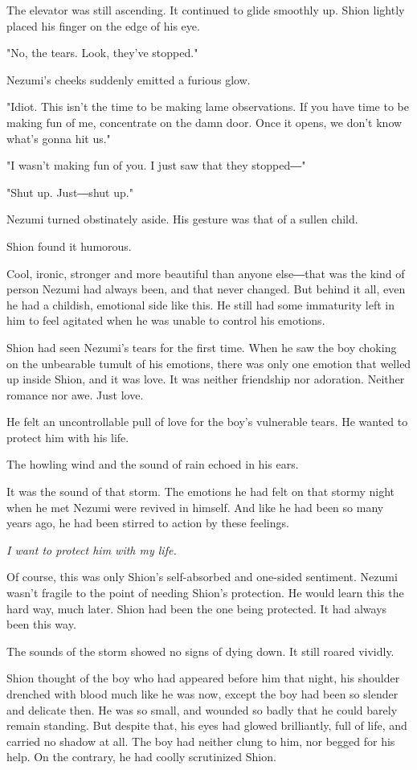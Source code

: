 The elevator was still ascending. It continued to glide smoothly up.
Shion lightly placed his finger on the edge of his eye.

"No, the tears. Look, they've stopped."

Nezumi's cheeks suddenly emitted a furious glow.

"Idiot. This isn't the time to be making lame observations. If you have
time to be making fun of me, concentrate on the damn door. Once it
opens, we don't know what's gonna hit us."

"I wasn't making fun of you. I just saw that they stopped―"

"Shut up. Just―shut up."

Nezumi turned obstinately aside. His gesture was that of a sullen child.

Shion found it humorous.

Cool, ironic, stronger and more beautiful than anyone else―that was the
kind of person Nezumi had always been, and that never changed. But
behind it all, even he had a childish, emotional side like this. He
still had some immaturity left in him to feel agitated when he was
unable to control his emotions.

Shion had seen Nezumi's tears for the first time. When he saw the boy
choking on the unbearable tumult of his emotions, there was only one
emotion that welled up inside Shion, and it was love. It was neither
friendship nor adoration. Neither romance nor awe. Just love.

He felt an uncontrollable pull of love for the boy's vulnerable tears.
He wanted to protect him with his life.

The howling wind and the sound of rain echoed in his ears.

It was the sound of that storm. The emotions he had felt on that stormy
night when he met Nezumi were revived in himself. And like he had been
so many years ago, he had been stirred to action by these feelings.

\emph{I want to protect him with my life.}

Of course, this was only Shion's self-absorbed and one-sided sentiment.
Nezumi wasn't fragile to the point of needing Shion's protection. He
would learn this the hard way, much later. Shion had been the one being
protected. It had always been this way.

The sounds of the storm showed no signs of dying down. It still roared
vividly.

Shion thought of the boy who had appeared before him that night, his
shoulder drenched with blood much like he was now, except the boy had
been so slender and delicate then. He was so small, and wounded so badly
that he could barely remain standing. But despite that, his eyes had
glowed brilliantly, full of life, and carried no shadow at all. The boy
had neither clung to him, nor begged for his help. On the contrary, he
had coolly scrutinized Shion.

